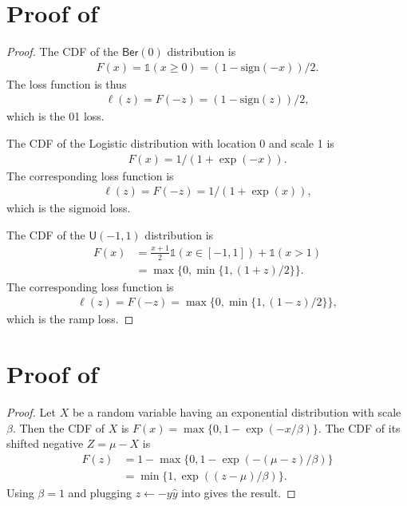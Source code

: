 \documentclass[letterpaper]{article} %
\newcommand{\ber}{{\mathsf{Ber}}}
\newcommand{\I}{\mathds{1}}
\begin{document}
\section{Proof of }
\distloss*
\begin{proof}
    The CDF of the $\ber(0)$ distribution is
    \begin{align*}
        F(x)=\I(x\geq 0)=(1-\mathrm{sign}(-x))/2.
    \end{align*}
    The loss function is thus 
    \begin{align*}
        \ell(z)=F(-z)=(1-\mathrm{sign}(z))/2,
    \end{align*}
    which is the 01 loss.

    \medskip
    The CDF of the Logistic distribution with location 0 and scale 1 is 
    \begin{align*}
        F(x)=1/(1+\exp(-x)).
    \end{align*} 
    The corresponding loss function is 
    \begin{align*}
        \ell(z)=F(-z)=1/(1+\exp(x)),
    \end{align*} 
    which is the sigmoid loss.

    \medskip
    The CDF of the $\mathsf{U}(-1,1)$ distribution is 
    \begin{align*}
        F(x) 
        &=\frac{x+1}{2}\I(x\in [-1,1])+\I(x>1) \\
        &=\max\{0,\min\{1,(1+z)/2\}\}.
    \end{align*} 
    The corresponding loss function is 
    \begin{align*}
        \ell(z)=F(-z)=\max\{0,\min\{1,(1-z)/2\}\},
    \end{align*}
    which is the ramp loss.
\end{proof}

\section{Proof of }
\neloss*
\begin{proof}
    Let $X$ be a random variable having an exponential distribution with scale $\beta$. Then the CDF of $X$ is
    $F(x)=\max\{0,1-\exp(-x/\beta)\}$.
    The CDF of its shifted negative $Z=\mu-X$ is
    \begin{align}
        F(z) &= 1-\max\{0,1-\exp(-(\mu-z)/\beta)\}\nonumber
        \\
        &=\min\{1,\exp((z-\mu)/\beta)\}.\label{eq:ycdf}
    \end{align}
    Using $\beta=1$ and plugging $z \gets -y\hat{y}$ into  gives the result. 
\end{proof}
\end{document}
